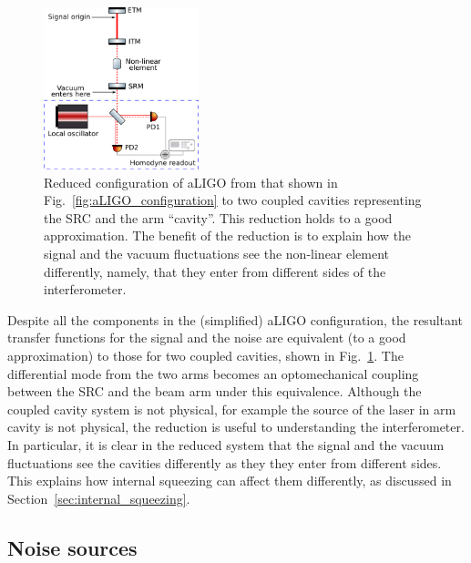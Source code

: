 \documentclass[aps,pra,superscriptaddress,reprint,nofootinbib]{revtex4-1}
\begin{document}
\begin{figure}[ht]
	\begin{center}
	\includegraphics[width=0.4\textwidth]{figures/aLIGO_as_coupled_cavities.pdf}
	\end{center}
	\caption{Reduced configuration of aLIGO from that shown in Fig.~\ref{fig:aLIGO_configuration} to two coupled cavities representing the SRC and the arm “cavity”. This reduction holds to a good approximation. The benefit of the reduction is to explain how the signal and the vacuum fluctuations see the non-linear element differently, namely, that they enter from different sides of the interferometer.}
	\label{fig:aLIGO_as_coupled_cavities}
\end{figure}

Despite all the components in the (simplified) aLIGO configuration, the resultant transfer functions for the signal and the noise are equivalent (to a good approximation) to those for two coupled cavities, shown in Fig.~\ref{fig:aLIGO_as_coupled_cavities}. The differential mode from the two arms becomes an optomechanical coupling between the SRC and the beam arm under this equivalence.
Although the coupled cavity system is not physical, for example the source of the laser in arm cavity is not physical, the reduction is useful to understanding the interferometer. In particular, it is clear in the reduced system that the signal and the vacuum fluctuations see the cavities differently as they they enter from different sides. This explains how internal squeezing can affect them differently, as discussed in Section~\ref{sec:internal_squeezing}.


\subsection{Noise sources}
\label{sec:noise_sources}
\end{document}
